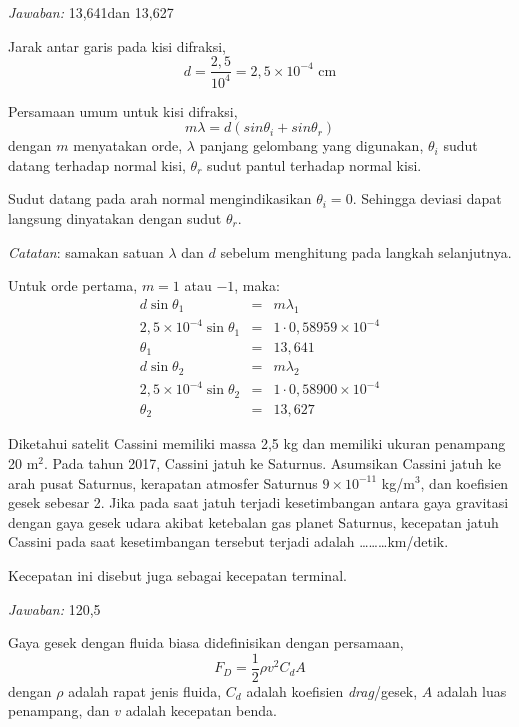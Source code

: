 \documentclass[11pt,fleqn]{exam}
\begin{document}
\begin{questions}
\textit{Jawaban:} 13,641\degree dan 13,627\degree

Jarak antar garis pada kisi difraksi, 
$$d=\frac{2,5}{10^4} = 2,5\times 10^{-4} \text{  cm}$$

Persamaan umum untuk kisi difraksi, 
$$m\lambda=d(sin \theta_i+sin \theta_r)$$
dengan $m$ menyatakan orde, $\lambda$ panjang gelombang yang digunakan, $\theta_i$ sudut datang terhadap normal kisi, $\theta_r$ sudut pantul terhadap normal kisi.

Sudut datang pada arah normal mengindikasikan $\theta_i=0$\degree. Sehingga deviasi dapat langsung dinyatakan dengan sudut $\theta_r$.

\textit{Catatan}: samakan satuan $\lambda$ dan $d$ sebelum menghitung pada langkah selanjutnya.

Untuk orde pertama, $m=1$ atau $-1$, maka:
\begin{eqnarray*}
d \sin \theta_1 &=& m \lambda_1\\
2,5\times 10^{-4} \sin \theta_1 &=& 1 \cdot 0,58959\times 10^{-4}\\
\theta_1 &=& 13,641\\
d \sin \theta_2 &=& m \lambda_2\\
2,5\times 10^{-4} \sin \theta_2 &=& 1 \cdot 0,58900\times 10^{-4}\\
\theta_2 &=& 13,627
\end{eqnarray*}



\question Diketahui satelit Cassini memiliki massa 2,5 kg dan memiliki ukuran penampang 20 m$^2$. Pada tahun 2017, Cassini jatuh ke Saturnus. Asumsikan Cassini jatuh ke arah pusat Saturnus, kerapatan atmosfer Saturnus $9 \times 10^{-11}$ kg/m$^3$, dan koefisien gesek sebesar 2. Jika pada saat jatuh terjadi kesetimbangan antara gaya gravitasi dengan gaya gesek udara akibat ketebalan gas planet Saturnus, kecepatan jatuh Cassini pada saat kesetimbangan tersebut terjadi adalah \ldots\ldots\ldots km/detik.

Kecepatan ini disebut juga sebagai kecepatan terminal.


\textit{Jawaban: } 120,5

Gaya gesek dengan fluida biasa didefinisikan dengan persamaan,
\begin{equation*}
F_D = \frac{1}{2} \rho v^2 C_d A
\end{equation*}
dengan $\rho$ adalah rapat jenis fluida, $C_d$ adalah koefisien \textit{drag}/gesek, $A$ adalah luas penampang, dan $v$ adalah kecepatan benda.


\end{questions}
\end{document}
